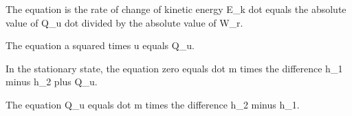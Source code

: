 The equation is the rate of change of kinetic energy E_k dot equals the absolute value of Q_u dot divided by the absolute value of W_r.

The equation a squared times u equals Q_u.

In the stationary state, the equation zero equals dot m times the difference h_1 minus h_2 plus Q_u.

The equation Q_u equals dot m times the difference h_2 minus h_1.